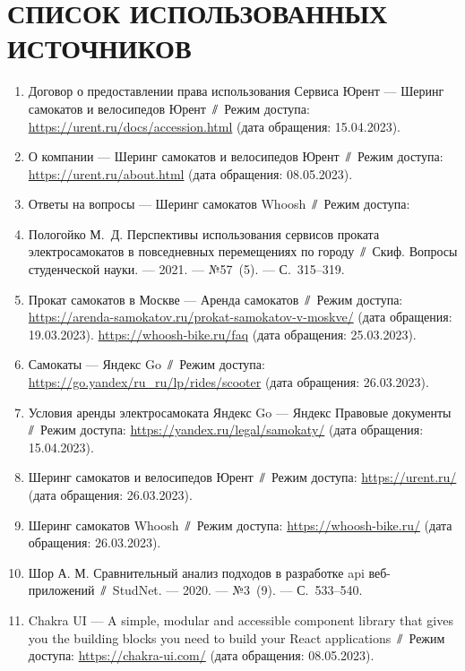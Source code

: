 \chapter*{СПИСОК ИСПОЛЬЗОВАННЫХ ИСТОЧНИКОВ}

\begin{enumerate}
    \item \label{urent-reqs} Договор о предоставлении права использования Сервиса Юрент --- Шеринг самокатов и велосипедов Юрент~$\sslash$~Режим доступа: \url{https://urent.ru/docs/accession.html} (дата обращения: 15.04.2023).
    \item \label{urent-cities} О компании --- Шеринг самокатов и велосипедов Юрент~$\sslash$~Режим доступа: \url{https://urent.ru/about.html} (дата обращения: 08.05.2023).
    \item \label{whoosh-reqs} Ответы на вопросы --- Шеринг самокатов Whoosh~$\sslash$~Режим доступа:
    \item \label{popularity} Пологойко М.~Д. Перспективы использования сервисов проката электросамокатов в повседневных перемещениях по городу~$\sslash$~Скиф. Вопросы студенческой науки. --- 2021. --- №57~(5). --- С.~315--319.
    \item \label{hype} Прокат самокатов в Москве --- Аренда самокатов~$\sslash$~Режим доступа: \url{https://arenda-samokatov.ru/prokat-samokatov-v-moskve/} (дата обращения: 19.03.2023).
          \url{https://whoosh-bike.ru/faq} (дата обращения: 25.03.2023).
    \item \label{yago} Самокаты --- Яндекс Go~$\sslash$~Режим доступа: \url{https://go.yandex/ru_ru/lp/rides/scooter} (дата обращения: 26.03.2023).
    \item \label{yago-reqs} Условия аренды электросамоката Яндекс Go --- Яндекс Правовые документы~$\sslash$~Режим доступа: \url{https://yandex.ru/legal/samokaty/} (дата обращения: 15.04.2023).
    \item \label{urent} Шеринг самокатов и велосипедов Юрент~$\sslash$~Режим доступа: \url{https://urent.ru/} (дата обращения: 26.03.2023).
    \item \label{whoosh} Шеринг самокатов Whoosh~$\sslash$~Режим доступа: \url{https://whoosh-bike.ru/} (дата обращения: 26.03.2023).
    \item \label{rest} Шор А. М. Сравнительный анализ подходов в разработке api веб-приложений~$\sslash$~StudNet. --- 2020. --- №3~(9). --- С.~533--540.
    \item \label{chakra} Chakra UI --- A simple, modular and accessible component library that gives you the building blocks you need to build your React applications~$\sslash$~Режим доступа: \url{https://chakra-ui.com/} (дата обращения: 08.05.2023).

\end{enumerate}
